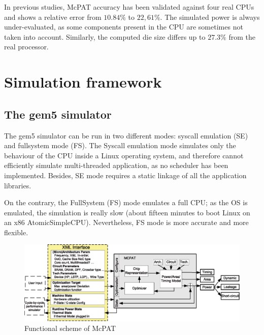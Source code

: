 \documentclass{article}
\begin{document}
\begin{multicols}{2}
In previous studies, McPAT accuracy has been validated against four real CPUs\cite{McPAT} and shows a relative error from $10.84\%$ to $22,61\%$. The simulated power is always under-evaluated, as some components present in the CPU are sometimes not taken into account. Similarly, the computed die size differs up to $27.3\%$ from the real processor.



\section{Simulation framework}
\label{sim}

\subsection{The gem5 simulator}

The gem5 simulator can be run in two different modes: syscall emulation (SE) and fullsystem mode (FS). The Syscall emulation mode simulates only the behaviour of the CPU inside a Linux operating system, and therefore cannot efficiently simulate multi-threaded application, as no scheduler has been implemented. Besides, SE mode requires a static linkage of all the application libraries.

On the contrary, the FullSystem (FS) mode emulates a full CPU; as the OS is emulated, the simulation is really slow (about fifteen minutes to boot Linux on an x86 AtomicSimpleCPU). Nevertheless, FS mode is more accurate and more flexible.

\end{multicols}
\begin{figure}[ht]
\begin{center}
\includegraphics[width=0.85\linewidth]{McPAT_diag.eps}
\caption{\label{McPAT_schema}Functional scheme of McPAT}
\end{center}
\end{figure}

\newpage
\end{document}

